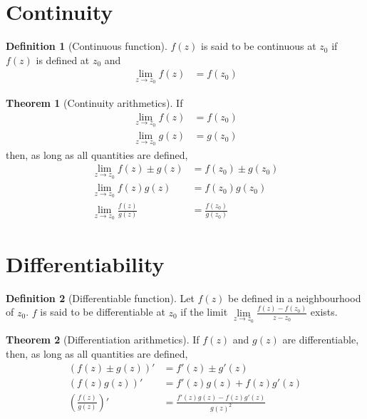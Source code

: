 \documentclass[fleqn, a4paper, 12pt, twoside]{article}
\theoremstyle{definition}
\newtheorem{definition}{Definition}
\theoremstyle{theorem}
\newtheorem{theorem}{Theorem}
\begin{document}
\section{Continuity}

\begin{definition}[Continuous function]
	$f(z)$ is said to be continuous at $z_0$ if $f(z)$ is defined at $z_0$ and 
	\begin{align*}
		\lim\limits_{z \to z_0} f(z) & = f(z_0)
	\end{align*}
\end{definition}

\begin{theorem}[Continuity arithmetics]
	If
	\begin{align*}
		\lim\limits_{z \to z_0} f(z) & = f(z_0) \\
		\lim\limits_{z \to z_0} g(z) & = g(z_0)
	\end{align*}
	then, as long as all quantities are defined,
	\begin{align*}
		\lim\limits_{z \to z_0} f(z) \pm g(z)     & = f(z_0) \pm g(z_0) \\
		\lim\limits_{z \to z_0} f(z) g(z)         & = f(z_0) g(z_0)     \\
		\lim\limits_{z \to z_0} \frac{f(z)}{g(z)} & = \frac{f(z_0)}{g(z_0)}
	\end{align*}
\end{theorem}

\section{Differentiability}

\begin{definition}[Differentiable function]
	Let $f(z)$ be defined in a neighbourhood of $z_0$.
	$f$ is said to be differentiable at $z_0$ if the limit $\lim\limits_{z \to z_0} \frac{f(z) - f(z_0)}{z - z_0}$ exists.
\end{definition}

\begin{theorem}[Differentiation arithmetics]
	If $f(z)$ and $g(z)$ are differentiable, then, as long as all quantities are defined,
	\begin{align*}
		\left( f(z) \pm g(z) \right)'     & = f'(z) \pm g'(z)         \\
		\left( f(z) g(z) \right)'         & = f'(z) g(z) + f(z) g'(z) \\
		\left( \frac{f(z)}{g(z)} \right)' & = \frac{f'(z) g(z) - f(z) g'(z)}{{g(z)}^2}
	\end{align*}
\end{theorem}
\end{document}
